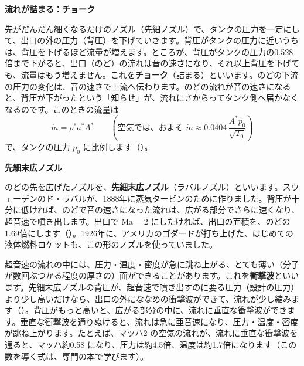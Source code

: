 \noindent\textbf{流れが詰まる：チョーク}\par\nobreak
先がだんだん細くなるだけのノズル（先細ノズル）で、タンクの圧力を一定にして、出口の外の圧力（背圧）を下げていきます。背圧がタンクの圧力に近いうちは、背圧を下げるほど流量が増えます。ところが、背圧がタンクの圧力の0.528倍まで下がると、出口（のど）の流れは音の速さになり、それ以上背圧を下げても、流量はもう増えません。これを\textbf{チョーク}（詰まる）といいます。のどの下流の圧力の変化は、音の速さで上流へ伝わります。のどの流れが音の速さになると、背圧が下がったという「知らせ」が、流れにさからってタンク側へ届かなくなるのです。このときの流量は
\[ \dot m=\rho^*a^*A^*\qquad(\text{空気では、およそ }\dot m\approx0.0404\,\frac{A^*p_0}{\sqrt{T_0}}) \]
で、タンクの圧力 $p_0$ に比例します（）。

\noindent\textbf{先細末広ノズル}\par\nobreak
のどの先を広げたノズルを、\textbf{先細末広ノズル}（ラバルノズル）といいます。スウェーデンのド・ラバルが、1888年に蒸気タービンのために作りました。背圧が十分に低ければ、のどで音の速さになった流れは、広がる部分でさらに速くなり、超音速で噴き出します。出口で $\mathrm{Ma}=2$ にしたければ、出口の面積を、のどの1.69倍にします（）。1926年に、アメリカのゴダードが打ち上げた、はじめての液体燃料ロケットも、この形のノズルを使っていました。

\begin{bkfigure}
\label{ph:熱-4:fig-shape}
\end{bkfigure}


\leavevmode\label{ph:熱-4:sec9}超音速の流れの中には、圧力・温度・密度が急に跳ね上がる、とても薄い（分子が数回ぶつかる程度の厚さの）面ができることがあります。これを\textbf{衝撃波}といいます。先細末広ノズルの背圧が、超音速で噴き出すのに要る圧力（設計の圧力）より少し高いだけなら、出口の外にななめの衝撃波ができて、流れが少し縮みます（）。背圧がもっと高いと、広がる部分の中に、流れに垂直な衝撃波ができます。垂直な衝撃波を通りぬけると、流れは急に亜音速になり、圧力・温度・密度が跳ね上がります。たとえば、マッハ2 の空気の流れが、流れに垂直な衝撃波を通ると、マッハ約0.58 になり、圧力は約4.5倍、温度は約1.7倍になります（この数を導く式は、専門の本で学びます）。

